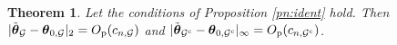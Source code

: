 \documentclass[12pt]{article}
\newtheorem{theorem}{Theorem}
\newcommand{\bTheta}{\boldsymbol \Theta}
\newcommand{\btheta}{\boldsymbol \theta}
\def\T{{\scriptscriptstyle \top} }
\newcommand{\btc}{{\rm c}}
\newcommand{\0}{{\bf 0}}
\begin{document}
 




\begin{theorem}\label{tm:consistency}
Let the conditions of Proposition {\rm\ref{pn:ident}} hold. Then $|\tilde{\btheta}_{\mathcal{G}}-\btheta_{0,\mathcal{G}}|_2=O_{\rm p}(c_{n,\mathcal{G}})$ and $|\tilde{\btheta}_{\mathcal{G}^{\btc}}-\btheta_{0,\mathcal{G}^{\btc}}|_\infty=O_{\rm p}(c_{n,\mathcal{G}^{\btc}})$. 
\end{theorem}
\end{document}
